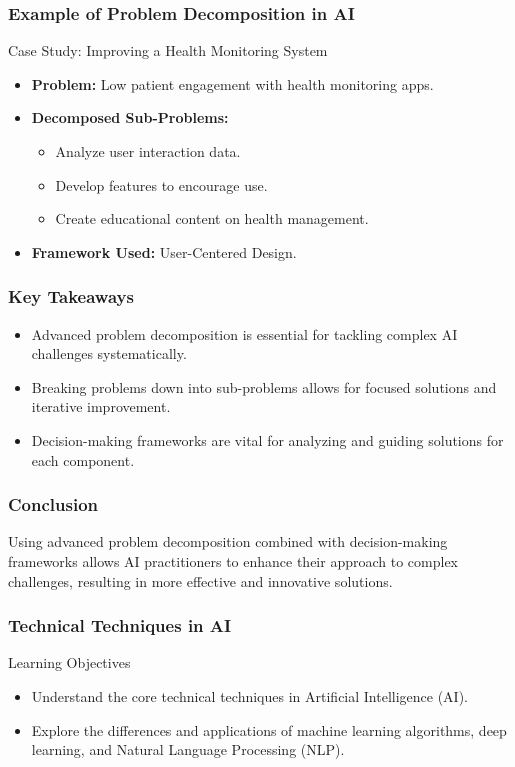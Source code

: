\documentclass[aspectratio=169]{beamer}
\begin{document}
\begin{frame}[fragile]
    \frametitle{Example of Problem Decomposition in AI}
    \begin{block}{Case Study: Improving a Health Monitoring System}
        \begin{itemize}
            \item \textbf{Problem:} Low patient engagement with health monitoring apps.
            \item \textbf{Decomposed Sub-Problems:}
            \begin{itemize}
                \item Analyze user interaction data.
                \item Develop features to encourage use.
                \item Create educational content on health management.
            \end{itemize}
            \item \textbf{Framework Used:} User-Centered Design.
        \end{itemize}
    \end{block}
\end{frame}

\begin{frame}[fragile]
    \frametitle{Key Takeaways}
    \begin{itemize}
        \item Advanced problem decomposition is essential for tackling complex AI challenges systematically.
        \item Breaking problems down into sub-problems allows for focused solutions and iterative improvement.
        \item Decision-making frameworks are vital for analyzing and guiding solutions for each component.
    \end{itemize}
\end{frame}

\begin{frame}[fragile]
    \frametitle{Conclusion}
    Using advanced problem decomposition combined with decision-making frameworks allows AI practitioners to enhance their approach to complex challenges, resulting in more effective and innovative solutions.
\end{frame}

\begin{frame}[fragile]
    \frametitle{Technical Techniques in AI}
    \begin{block}{Learning Objectives}
        \begin{itemize}
            \item Understand the core technical techniques in Artificial Intelligence (AI).
            \item Explore the differences and applications of machine learning algorithms, deep learning, and Natural Language Processing (NLP).
        \end{itemize}
    \end{block}
\end{frame}
\end{document}
